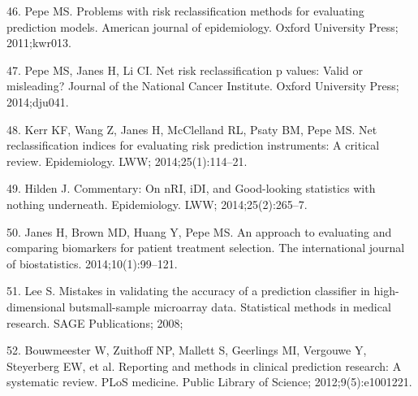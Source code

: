 \documentclass[11pt]{article}
\begin{document}
46. Pepe MS. Problems with risk reclassification methods for evaluating
prediction models. American journal of epidemiology. Oxford University
Press; 2011;kwr013.

47. Pepe MS, Janes H, Li CI. Net risk reclassification p values: Valid
or misleading? Journal of the National Cancer Institute. Oxford
University Press; 2014;dju041.

48. Kerr KF, Wang Z, Janes H, McClelland RL, Psaty BM, Pepe MS. Net
reclassification indices for evaluating risk prediction instruments: A
critical review. Epidemiology. LWW; 2014;25(1):114--21.

49. Hilden J. Commentary: On nRI, iDI, and Good-looking statistics
with nothing underneath. Epidemiology. LWW; 2014;25(2):265--7.

50. Janes H, Brown MD, Huang Y, Pepe MS. An approach to evaluating and
comparing biomarkers for patient treatment selection. The international
journal of biostatistics. 2014;10(1):99--121.

51. Lee S. Mistakes in validating the accuracy of a prediction
classifier in high-dimensional butsmall-sample microarray data.
Statistical methods in medical research. SAGE Publications; 2008;

52. Bouwmeester W, Zuithoff NP, Mallett S, Geerlings MI, Vergouwe Y,
Steyerberg EW, et al. Reporting and methods in clinical prediction
research: A systematic review. PLoS medicine. Public Library of Science;
2012;9(5):e1001221.
\end{document}
